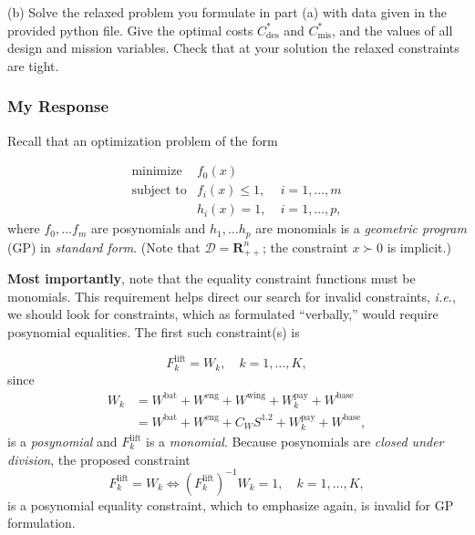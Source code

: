 \documentclass[12pt,reqno]{article}
\theoremstyle{definition}
\numberwithin{equation}{section}
\begin{document}
    \vspace{0.1cm}
    \noindent(b) Solve the relaxed problem you formulate in part (a) with data given in the provided python file.
    Give the optimal costs $C_{\text{des}}^{*}$ and $C_{\text{mis}}^{*}$, and the values of all design and mission variables. 
    Check that at your solution the relaxed constraints are tight.
    
    \subsubsection*{My Response}
    Recall that an optimization problem of the form
    
    \[
    \begin{array}{lll}
    \text{minimize} \; & f_0(x) & \\
    \text{subject to} & f_i(x) \le 1, \; & i = 1, \ldots, m \\
    & h_i(x) = 1, \; & i = 1, \ldots, p,
    \end{array}
    \]
    where $f_0, \ldots f_m$ are posynomials and $h_1, \ldots h_p$ are monomials is a \textit{geometric program} (GP)
    in \textit{standard form}. (Note that $\mathcal{D} = \mathbf{R}^n_{++}$; the constraint $x \succ 0$ is implicit.)
    
    \textbf{Most importantly}, note that the equality constraint functions must be monomials. This requirement helps direct
    our search for invalid constraints, \textit{i.e.}, we should look for constraints, which as formulated ``verbally,''
    would require posynomial equalities. The first such constraint(s) is

    \[F_k^{\mathrm{lift}} = W_k, \quad k=1, \ldots, K,\]
    since 
    \[\begin{aligned}
        W_k &= W^{\mathrm{bat}} + W^{\mathrm{eng}} + W^{\mathrm{wing}} + W^{\mathrm{pay}}_k + W^{\mathrm{base}} \\
        &=W^{\mathrm{bat}} + W^{\mathrm{eng}} + C_W S^{1.2} + W^{\mathrm{pay}}_k + W^{\mathrm{base}},
    \end{aligned}\]
    is a \textit{posynomial} and $F_k^{\mathrm{lift}}$ is a \textit{monomial}. Because posynomials are
    \textit{closed under division}, the proposed constraint \[F_k^{\mathrm{lift}} = W_k \Longleftrightarrow \left(F_k^{\mathrm{lift}}\right)^{-1}W_k = 1, \quad k=1, \ldots, K,\]
    is a posynomial equality constraint, which to emphasize again, is invalid for GP formulation.
\end{document}
